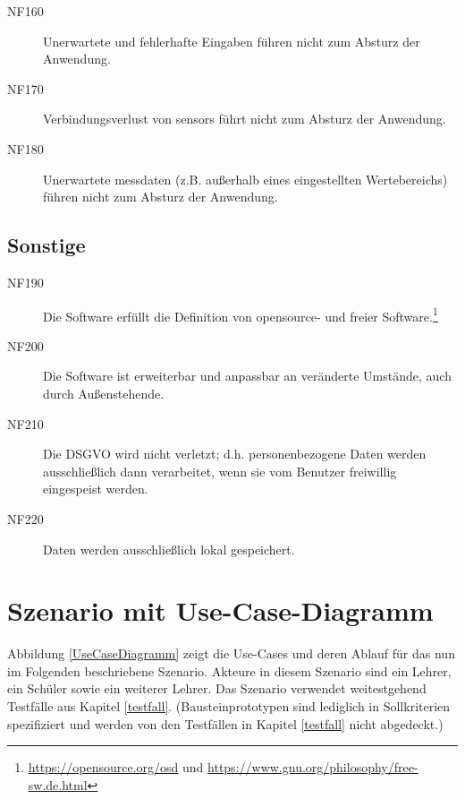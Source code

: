 \documentclass[parskip=full]{scrartcl}
\begin{document}
\begin{description}

\item[NF160] Unerwartete und fehlerhafte Eingaben führen nicht zum Absturz der Anwendung.
\item[NF170] Verbindungsverlust von \glspl{sensor} führt nicht zum Absturz der Anwendung.
\item[NF180] Unerwartete \gls{messdaten} (z.B. außerhalb eines eingestellten Wertebereichs) führen nicht zum Absturz der Anwendung.

\end{description}

\subsection{Sonstige}

\begin{description}

\item[NF190] Die Software erfüllt die Definition von \gls{opensource}- und freier Software.\footnote{\url{https://opensource.org/osd} und \url{https://www.gnu.org/philosophy/free-sw.de.html}}
\item[NF200] Die Software ist erweiterbar und anpassbar an veränderte Umstände, auch durch Außenstehende.
\item[NF210] Die \gls{DSGVO} wird nicht verletzt; d.h. personenbezogene Daten werden ausschließlich dann verarbeitet, wenn sie vom Benutzer freiwillig eingespeist werden.
\item[NF220] Daten werden ausschließlich lokal gespeichert.

\end{description}

\clearpage
\section{Szenario mit Use-Case-Diagramm}\label{scenario}

Abbildung \ref{UseCaseDiagramm} zeigt die Use-Cases und deren Ablauf für das nun im Folgenden beschriebene Szenario. Akteure in diesem Szenario sind ein Lehrer, ein Schüler sowie ein weiterer Lehrer. Das Szenario verwendet weitestgehend Testfälle aus Kapitel \ref{testfall}. (Bausteinprototypen sind lediglich in Sollkriterien spezifiziert und werden von den Testfällen in Kapitel \ref{testfall} nicht abgedeckt.)
\end{document}
